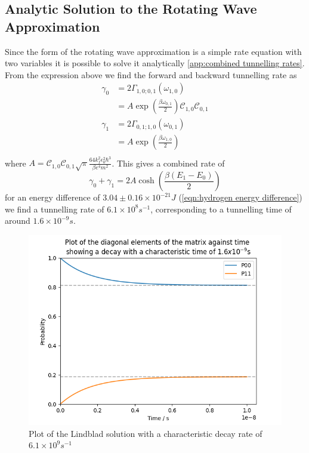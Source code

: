 \subsection{Analytic Solution to the Rotating Wave Approximation}
Since the form of the rotating
wave approximation is a simple
rate equation with two variables
it is possible to solve it analytically
\cref{app:combined tunnelling rates}.
From the expression above we find the
forward and backward tunnelling rate as
\begin{align}
  \gamma_0 & = 2\Gamma_{1,0;0, 1}(\omega_{1,0})       \\
           & = A \exp{(\frac{\beta \omega_{0,1}}{2})}
  \mathcal{C}_{1,0} \mathcal{C}_{0,1}                 \\
  \gamma_1 & = 2\Gamma_{0,1;1, 0}(\omega_{0,1})       \\
           & = A \exp{(\frac{\beta \omega_{1,0}}{2})} \\
\end{align}
where
\(A =
\mathcal{C}_{1,0} \mathcal{C}_{0,1}
\sqrt{\pi}
\frac{64 k_f^2 \epsilon_0^2 \hbar^3}{\beta e^4 m^2}\).
This gives a combined rate of
\begin{equation}
  \gamma_0 + \gamma_1 = 2A\cosh{(\frac{\beta (E_1 - E_0)}{2})}
  \label{eqn:theoretical rate lindblad equation}
\end{equation}
for an energy difference of
\(3.04\pm0.16\times{}10^{-21} J\)
(\cref{eqn:hydrogen energy difference})
we find a tunnelling rate of
\(6.1\times{}10^{8}s^{-1}\),
corresponding to a
tunnelling time of around
\(1.6\times{}10^{-9}s\).
\begin{figure}
  \centering
  \includegraphics[width=.5\linewidth]{Figures/Redfield/Plot of lindblad solution.png}
  \caption{Plot of the Lindblad solution with a characteristic decay
  rate of \(6.1\times{}10^{9}s^{-1}\)}
\end{figure}

